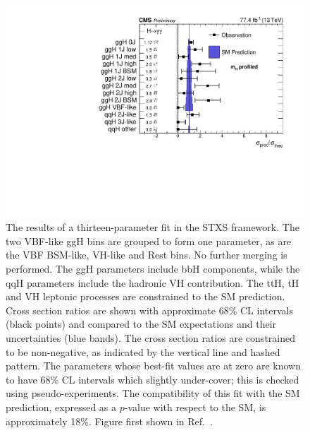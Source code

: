 \begin{figure}[hptb]
  \centering
  \includegraphics[width=\textwidth]{Figures/Results/Stage1Min.pdf}
  \caption[Results of a thirteen-parameter fit in the STXS framework.]
  {
    The results of a thirteen-parameter fit in the STXS framework. 
    The two VBF-like ggH bins are grouped to form one parameter, 
    as are the VBF BSM-like, VH-like and Rest bins.
    No further merging is performed. 
    The ggH parameters include bbH components, 
    while the qqH parameters include the hadronic VH contribution. 
    The ttH, tH and VH leptonic processes are constrained to the SM prediction. 
    Cross section ratios are shown with approximate 68\% CL intervals (black points) 
    and compared to the SM expectations and their uncertainties (blue bands). 
    The cross section ratios are constrained to be non-negative, 
    as indicated by the vertical line and hashed pattern. 
    The parameters whose best-fit values are at zero are known to have 68\% CL intervals 
    which slightly under-cover; this is checked using pseudo-experiments. 
    The compatibility of this fit with the SM prediction, 
    expressed as a $p$-value with respect to the SM, is approximately 18\%.
    Figure first shown in Ref.~\cite{HIG-18-029}.
  }
  \label{fig:results_stage1min}
\end{figure}


